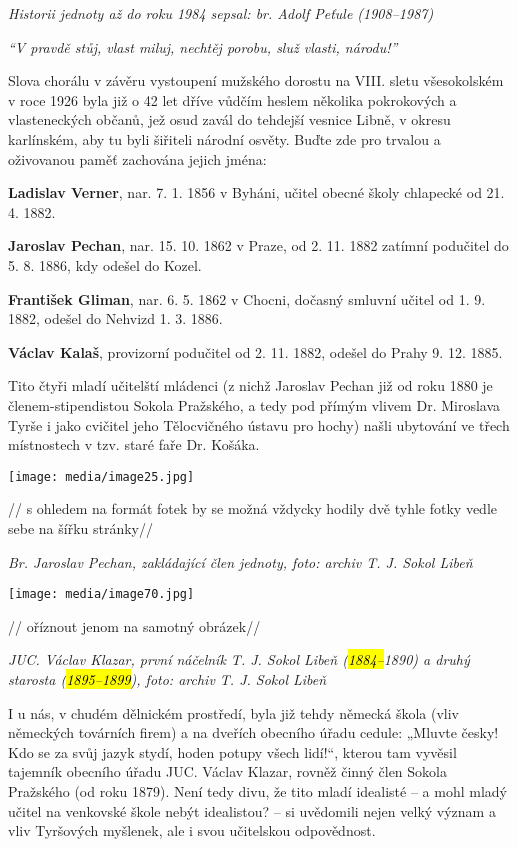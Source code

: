 \emph{Historii jednoty až do roku 1984 sepsal: br. Adolf Peťule
(1908--1987)}

\emph{``V pravdě stůj, vlast miluj, nechtěj porobu, služ vlasti,
národu!''}

Slova chorálu v závěru vystoupení mužského dorostu na VIII. sletu
všesokolském v roce 1926 byla již o 42 let dříve vůdčím heslem několika
pokrokových a vlasteneckých občanů, jež osud zavál do tehdejší vesnice
Libně, v okresu karlínském, aby tu byli šiřiteli národní osvěty. Buďte
zde pro trvalou a oživovanou paměť zachována jejich jména:

\textbf{Ladislav Verner}, nar. 7. 1. 1856 v Byháni, učitel obecné školy
chlapecké od 21. 4. 1882.

\textbf{Jaroslav Pechan}, nar. 15. 10. 1862 v Praze, od 2. 11. 1882
zatímní podučitel do 5. 8. 1886, kdy odešel do Kozel.

\textbf{František Gliman}, nar. 6. 5. 1862 v Chocni, dočasný smluvní
učitel od 1. 9. 1882, odešel do Nehvizd 1. 3. 1886.

\textbf{Václav Kalaš}, provizorní podučitel od 2. 11. 1882, odešel do
Prahy 9. 12. 1885.

Tito čtyři mladí učitelští mládenci (z nichž Jaroslav Pechan již od roku
1880 je členem-stipendistou Sokola Pražského, a tedy pod přímým vlivem
Dr. Miroslava Tyrše i jako cvičitel jeho Tělocvičného ústavu pro hochy)
našli ubytování ve třech místnostech v tzv. staré faře Dr. Košáka.

\texttt{[image: media/image25.jpg]}

// s ohledem na formát fotek by se možná vždycky hodily dvě tyhle fotky
vedle sebe na šířku stránky//

\emph{Br. Jaroslav Pechan, zakládající člen jednoty, foto: archiv T. J.
Sokol Libeň}

\texttt{[image: media/image70.jpg]}

// oříznout jenom na samotný obrázek//

\emph{JUC. Václav Klazar, první náčelník T. J. Sokol Libeň
(\hl{1884--⁠⁠⁠⁠⁠⁠}1890) a druhý starosta (\hl{1895--⁠⁠⁠⁠⁠⁠1899}), foto: archiv T. J.
Sokol Libeň}

I u nás, v chudém dělnickém prostředí, byla již tehdy německá škola
(vliv německých továrních firem) a na dveřích obecního úřadu cedule:
„Mluvte česky! Kdo se za svůj jazyk stydí, hoden potupy všech lidí!{}``,
kterou tam vyvěsil tajemník obecního úřadu JUC. Václav Klazar, rovněž
činný člen Sokola Pražského (od roku 1879). Není tedy divu, že tito
mladí idealisté --⁠⁠⁠⁠⁠⁠ a mohl mladý učitel na venkovské škole nebýt
idealistou? --⁠⁠⁠⁠⁠⁠ si uvědomili nejen velký význam a vliv Tyršových
myšlenek, ale i svou učitelskou odpovědnost.

